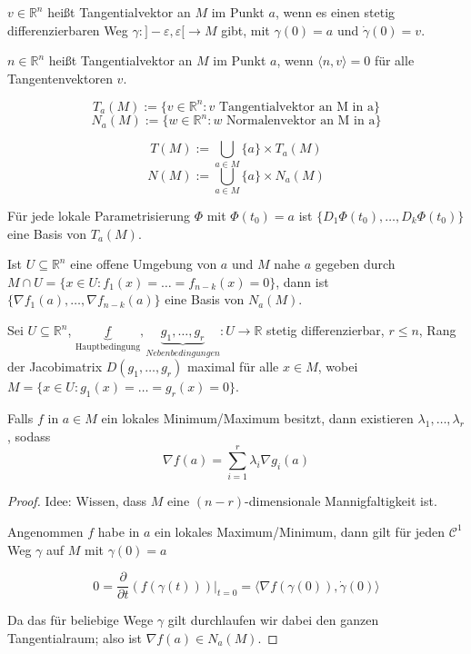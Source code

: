 \begin{definition}[Tangentialvektor]
	$v \in \mathbb R^n$ hei\ss t Tangentialvektor an $M$ im Punkt $a$, wenn es einen stetig differenzierbaren Weg $\gamma: ]-\varepsilon, \varepsilon[\rightarrow M$ gibt, mit $\gamma(0)=a$ und $\dot\gamma(0) = v$.
\end{definition}
\begin{definition}[Normalenvektor]
	$n \in \mathbb R^n$ hei\ss t Tangentialvektor an $M$ im Punkt $a$, wenn $\langle n,v \rangle=0$ f\"ur alle Tangentenvektoren $v$.
\end{definition}

\begin{definition}
	$$T_a(M) := \{v\in\mathbb R^n : v\text{ Tangentialvektor an M in a} \}$$
	$$N_a(M) := \{w\in\mathbb R^n : w\text{ Normalenvektor an M in a} \}$$
\end{definition}
\begin{definition}
	$$T(M) := \bigcup_{a\in M}\{a\}\times T_a(M)$$
	$$N(M) := \bigcup_{a\in M}\{a\}\times N_a(M)$$
\end{definition}

\begin{theorem}
	F\"ur jede lokale Parametrisierung $\Phi$ mit $\Phi(t_0)=a$ ist $\{D_1\Phi(t_0),\dots,D_k\Phi(t_0)\}$ eine Basis von $T_a(M)$.
	
	Ist $U\subseteq \mathbb R^n$ eine offene Umgebung von $a$ und $M$ nahe $a$ gegeben durch $M\cap U=\{x \in U : f_1(x) = \dots = f_{n-k}(x)=0\}$, dann ist $\{\nabla f_1(a),\dots,\nabla f_{n-k}(a)\}$ eine Basis von $N_a(M)$.
\end{theorem}

\begin{corollary}[Lagrangemultiplikatoren]
	Sei $U\subseteq \mathbb R^n$, $\underbrace{f}_{\text{Hauptbedingung}},\underbrace{g_1,\dots,g_r}_{Nebenbedingungen}:U\rightarrow \mathbb R$ stetig differenzierbar, $r \leq n$, Rang der Jacobimatrix $D(g_1,\dots,g_r)$ maximal f\"ur alle $x\in M$, wobei $M=\{x\in U : g_1(x)=\dots=g_r(x)=0\}$.
	
	Falls $f$ in $a\in M$ ein lokales Minimum/Maximum besitzt, dann existieren $\lambda_1,\dots,\lambda_r$, sodass $$\nabla f(a)=\sum_{i=1}^r \lambda_i \nabla g_i(a)$$
\end{corollary}
\begin{proof}
	Idee: Wissen, dass $M$ eine $(n-r)$-dimensionale Mannigfaltigkeit ist.
	
	Angenommen $f$ habe in $a$ ein lokales Maximum/Minimum, dann gilt f\"ur jeden $\mathcal C^1$ Weg $\gamma$ auf $M$ mit $\gamma(0)=a$
	
	$$0 = \frac{\partial}{\partial t}(f(\gamma(t)))|_{t=0} = \langle \nabla f(\gamma(0)), \dot\gamma(0) \rangle$$
	
	Da das f\"ur beliebige Wege $\gamma$ gilt durchlaufen wir dabei den ganzen Tangentialraum; also ist $\nabla f(a) \in N_a(M)$.
\end{proof}


